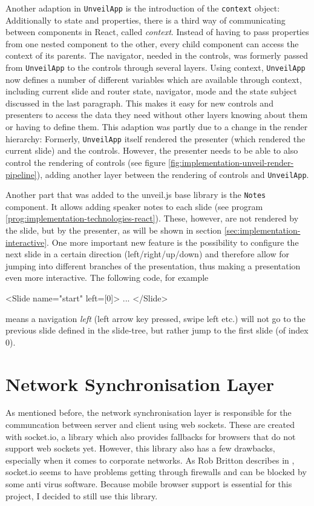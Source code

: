 Another adaption in \texttt{UnveilApp} is the introduction of the \texttt{context} object: Additionally to state and properties, there is a third way of communicating between components in React, called \emph{context}. Instead of having to pass properties from one nested component to the other, every child component can access the context of its parents. The navigator, needed in the controls, was formerly passed from \texttt{UnveilApp} to the controls through several layers. Using context, \texttt{UnveilApp} now defines a number of different variables which are available through context, including current slide and router state, navigator, mode and the state subject discussed in the last paragraph. This makes it easy for new controls and presenters to access the data they need without other layers knowing about them or having to define them.
This adaption was partly due to a change in the render hierarchy: Formerly, \texttt{UnveilApp} itself rendered the presenter (which rendered the current slide) and the controls. However, the presenter needs to be able to also control the rendering of controls (see figure \ref{fig:implementation-unveil-render-pipeline}), adding another layer between the rendering of controls and \texttt{UnveilApp}.

Another part that was added to the unveil.js base library is the \texttt{Notes} component. It allows adding speaker notes to each slide (see program \ref{prog:implementation-technologies-react}). These, however, are not rendered by the slide, but by the presenter, as will be shown in section \ref{sec:implementation-interactive}. One more important new feature is the possibility to configure the next slide in a certain direction (left/right/up/down) and therefore allow for jumping into different branches of the presentation, thus making a presentation even more interactive. The following code, for example
%
\begin{JsCode}
  <Slide name="start" left={[0]}>
    ...
  </Slide>
\end{JsCode}
%
means a navigation \emph{left} (left arrow key pressed, swipe left etc.) will not go to the previous slide defined in the slide-tree, but rather jump to the first slide (of index $0$).


\section{Network Synchronisation Layer}
\label{sec:implementation-network-sync}
As mentioned before, the network synchronisation layer is responsible for the communcation between server and client using web sockets. These are created with socket.io, a library which also provides fallbacks for browsers that do not support web sockets yet. However, this library also has a few drawbacks, especially when it comes to corporate networks. As Rob Britton describes in \cite{socketio-problems}, socket.io seems to have problems getting through firewalls and can be blocked by some anti virus software.
Because mobile browser support is essential for this project, I decided to still use this library.

